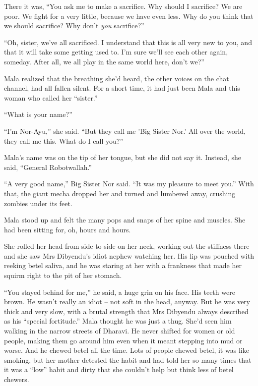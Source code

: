 There it was, ``You ask me to make a sacrifice. Why should I
sacrifice? We are poor. We fight for a very little, because we have
even less. Why do you think that we should sacrifice? Why don't
\emph{you} sacrifice?''

``Oh, sister, we've all sacrificed. I understand that this is all
very new to you, and that it will take some getting used to. I'm
sure we'll see each other again, someday. After all, we all play in
the same world here, don't we?''

Mala realized that the breathing she'd heard, the other voices on
the chat channel, had all fallen silent. For a short time, it had
just been Mala and this woman who called her ``sister.''

``What is your name?''

``I'm Nor-Ayu,'' she said. ``But they call me 'Big Sister Nor.' All
over the world, they call me this. What do I call you?''

Mala's name was on the tip of her tongue, but she did not say it.
Instead, she said, ``General Robotwallah.''

``A very good name,'' Big Sister Nor said. ``It was my pleasure to
meet you.'' With that, the giant mecha dropped her and turned and
lumbered away, crushing zombies under its feet.

Mala stood up and felt the many pops and snaps of her spine and
muscles. She had been sitting for, oh, hours and hours.

She rolled her head from side to side on her neck, working out the
stiffness there and she saw Mrs Dibyendu's idiot nephew watching
her. His lip was pouched with reeking betel saliva, and he was
staring at her with a frankness that made her squirm right to the
pit of her stomach.

``You stayed behind for me,'' he said, a huge grin on his face. His
teeth were brown. He wasn't really an idiot -- not soft in the
head, anyway. But he was very thick and very slow, with a brutal
strength that Mrs Dibyendu always described as his ``special
fortitude.'' Mala thought he was just a thug. She'd seen him walking
in the narrow streets of Dharavi. He never shifted for women or old
people, making them go around him even when it meant stepping into
mud or worse. And he chewed betel all the time. Lots of people
chewed betel, it was like smoking, but her mother detested the
habit and had told her so many times that it was a ``low'' habit and
dirty that she couldn't help but think less of betel chewers.


